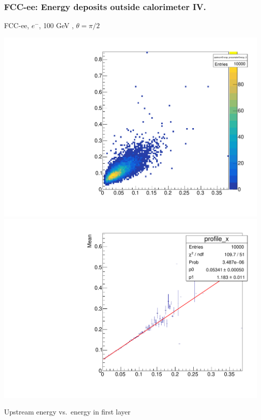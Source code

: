 \documentclass{beamer}
\newcommand{\redtext}[1]{%
  \textcolor{myRed}{#1}
}
\begin{document}
\begin{frame}
  \frametitle{FCC-ee: Energy deposits outside calorimeter IV.}

  \centering
  FCC-ee, $e^{-}$, \redtext{100 GeV}, $\theta = \pi/2$ \\[1.5ex]
  \begin{adjustwidth}{-9mm}{-9mm}
    \includegraphics[width=0.49\linewidth]{figures/upstream/hist_upstream_vs_layer_0_90deg_100GeV.pdf}
    \includegraphics[width=0.49\linewidth]{figures/upstream/profile_upstream_vs_layer_0_90deg_100GeV.pdf}
  \end{adjustwidth}
  \redtext{Upstream} energy vs.\ energy in first layer
\end{frame}
\end{document}

